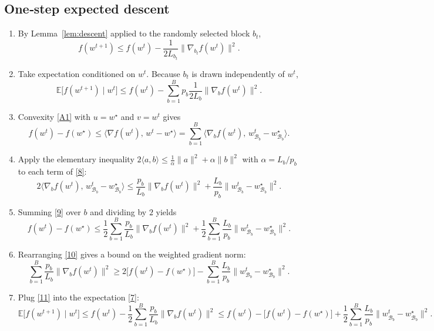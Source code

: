 \documentclass[11pt]{article}
\newcommand{\E}{\mathbb{E}}
\begin{document}
\subsection*{One‑step expected descent}
\begin{enumerate}[label=[Step \arabic*],leftmargin=*]
\item %
By Lemma~\ref{lem:descent} applied to the randomly selected block $b_{t}$,
\[
f(w^{t+1})\le f(w^{t})-\frac{1}{2L_{b_{t}}}
\bigl\|\nabla_{b_{t}}f(w^{t})\bigr\|^{2}.
\tag{6}
\]

\item %
Take expectation conditioned on $w^{t}$.
Because $b_{t}$ is drawn independently of $w^{t}$,
\[
\E\!\bigl[f(w^{t+1})\mid w^{t}\bigr]
\le f(w^{t})-
\sum_{b=1}^{B}p_{b}\frac{1}{2L_{b}}
\bigl\|\nabla_{b}f(w^{t})\bigr\|^{2}.
\tag{7}
\]

\item %
Convexity \eqref{A1} with $u=w^{\star}$ and $v=w^{t}$ gives
\[
f(w^{t})-f(w^{\star})\le
\langle \nabla f(w^{t}),\,w^{t}-w^{\star}\rangle
=\sum_{b=1}^{B}\langle \nabla_{b}f(w^{t}),\,
w^{t}_{\mathcal{B}_{b}}-w^{\star}_{\mathcal{B}_{b}}\rangle .
\tag{8}
\]

\item %
Apply the elementary inequality
$2\langle a,b\rangle\le \frac{1}{\alpha}\|a\|^{2}+\alpha\|b\|^{2}$
with $\alpha=L_{b}/p_{b}$ to each term of \eqref{8}:
\[
2\langle \nabla_{b}f(w^{t}),\,w^{t}_{\mathcal{B}_{b}}-w^{\star}_{\mathcal{B}_{b}}\rangle
\le
\frac{p_{b}}{L_{b}}\|\nabla_{b}f(w^{t})\|^{2}
+\frac{L_{b}}{p_{b}}\|w^{t}_{\mathcal{B}_{b}}-w^{\star}_{\mathcal{B}_{b}}\|^{2}.
\tag{9}
\]

\item %
Summing \eqref{9} over $b$ and dividing by $2$ yields
\[
f(w^{t})-f(w^{\star})\le
\frac12\sum_{b=1}^{B}\frac{p_{b}}{L_{b}}\|\nabla_{b}f(w^{t})\|^{2}
+\frac12\sum_{b=1}^{B}\frac{L_{b}}{p_{b}}
\|w^{t}_{\mathcal{B}_{b}}-w^{\star}_{\mathcal{B}_{b}}\|^{2}.
\tag{10}
\]

\item %
Rearranging \eqref{10} gives a bound on the weighted gradient norm:
\[
\sum_{b=1}^{B}\frac{p_{b}}{L_{b}}\|\nabla_{b}f(w^{t})\|^{2}
\ge
2\bigl[f(w^{t})-f(w^{\star})\bigr]
-
\sum_{b=1}^{B}\frac{L_{b}}{p_{b}}
\|w^{t}_{\mathcal{B}_{b}}-w^{\star}_{\mathcal{B}_{b}}\|^{2}.
\tag{11}
\]

\item %
Plug \eqref{11} into the expectation \eqref{7}:
\[
\E\!\bigl[f(w^{t+1})\mid w^{t}\bigr]
\le f(w^{t})-
\frac12\sum_{b=1}^{B}\frac{p_{b}}{L_{b}}\|\nabla_{b}f(w^{t})\|^{2}
\le
f(w^{t})-
\bigl[f(w^{t})-f(w^{\star})\bigr]
+\frac12\sum_{b=1}^{B}\frac{L_{b}}{p_{b}}
\|w^{t}_{\mathcal{B}_{b}}-w^{\star}_{\mathcal{B}_{b}}\|^{2}.
\tag{12}
\]


\end{enumerate}
\end{document}
